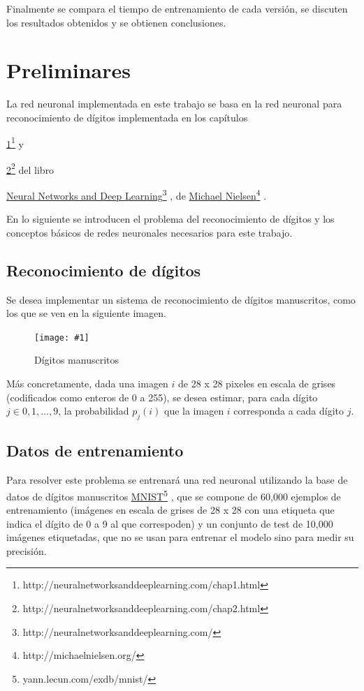 \documentclass[a4paper, 10pt, twoside]{article}
\newcommand{\img}[3]{
  \begin{figure}[H]
    \begin{center}
      \texttt{[image: \#1]}
    \end{center}
    \caption{#2}
    \label{#3}
  \end{figure}
}
\newcommand{\link}[2]{
  \href{#1}{#2}\footnote{#1}
}
\begin{document}
Finalmente se compara el tiempo de entrenamiento de cada versión, se discuten
los resultados obtenidos y se obtienen conclusiones.




\section{Preliminares}

La red neuronal implementada en este trabajo se basa en la red neuronal para
reconocimiento de dígitos implementada en los capítulos
\link{http://neuralnetworksanddeeplearning.com/chap1.html}{1} y
\link{http://neuralnetworksanddeeplearning.com/chap2.html}{2} del libro
\link{http://neuralnetworksanddeeplearning.com/}{Neural Networks and Deep
Learning}, de \link{http://michaelnielsen.org/}{Michael Nielsen}.

En lo siguiente se introducen el problema del reconocimiento de dígitos y los
conceptos básicos de redes neuronales necesarios para este trabajo.


\subsection{Reconocimiento de dígitos}

Se desea implementar un sistema de reconocimiento de dígitos manuscritos, como
los que se ven en la siguiente imagen.

\img{digits.png}{Dígitos manuscritos}{img:digits}

Más concretamente, dada una imagen $i$ de 28 x 28 pixeles en escala de grises
(codificados como enteros de 0 a 255), se desea estimar, para cada dígito $j
\in {0, 1, \ldots, 9}$, la probabilidad $p_j(i)$ que la imagen $i$ corresponda
a cada dígito $j$.


\subsection{Datos de entrenamiento}

Para resolver este problema se entrenará una red neuronal utilizando la base de
datos de dígitos manuscritos \link{yann.lecun.com/exdb/mnist/}{MNIST}, que se
compone de 60,000 ejemplos de entrenamiento (imágenes en escala de grises de 28
x 28 con una etiqueta que indica el dígito de 0 a 9 al que correspoden) y un
conjunto de test de 10,000 imágenes etiquetadas, que no se usan para entrenar
el modelo sino para medir su precisión.
\end{document}
